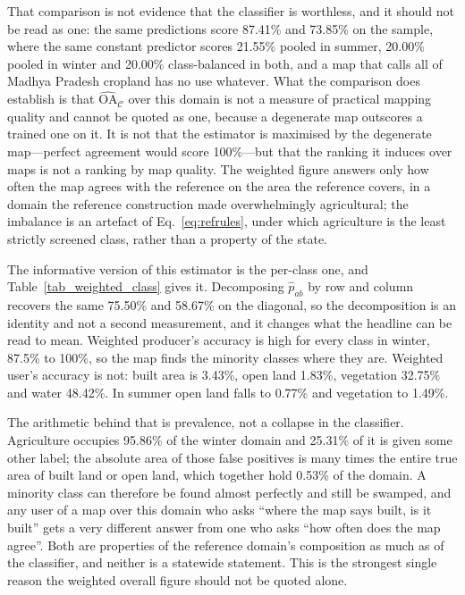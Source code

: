 \documentclass[conference]{IEEEtran}
\begin{document}
That comparison is not evidence that the classifier is worthless, and it should not be read as one: the same predictions score 87.41\% and 73.85\% on the sample, where the same constant predictor scores 21.55\% pooled in summer, 20.00\% pooled in winter and 20.00\% class-balanced in both, and a map that calls all of Madhya Pradesh cropland has no use whatever. What the comparison does establish is that $\widehat{\mathrm{OA}}_{\mathcal{C}}$ over this domain is not a measure of practical mapping quality and cannot be quoted as one, because a degenerate map outscores a trained one on it. It is not that the estimator is maximised by the degenerate map---perfect agreement would score 100\%---but that the ranking it induces over maps is not a ranking by map quality. The weighted figure answers only how often the map agrees with the reference on the area the reference covers, in a domain the reference construction made overwhelmingly agricultural; the imbalance is an artefact of Eq.~\eqref{eq:refrules}, under which agriculture is the least strictly screened class, rather than a property of the state.

The informative version of this estimator is the per-class one, and Table~\ref{tab_weighted_class} gives it. Decomposing $\hat{p}_{ab}$ by row and column recovers the same 75.50\% and 58.67\% on the diagonal, so the decomposition is an identity and not a second measurement, and it changes what the headline can be read to mean. Weighted producer's accuracy is high for every class in winter, 87.5\% to 100\%, so the map finds the minority classes where they are. Weighted user's accuracy is not: built area is 3.43\%, open land 1.83\%, vegetation 32.75\% and water 48.42\%. In summer open land falls to 0.77\% and vegetation to 1.49\%.

The arithmetic behind that is prevalence, not a collapse in the classifier. Agriculture occupies 95.86\% of the winter domain and 25.31\% of it is given some other label; the absolute area of those false positives is many times the entire true area of built land or open land, which together hold 0.53\% of the domain. A minority class can therefore be found almost perfectly and still be swamped, and any user of a map over this domain who asks ``where the map says built, is it built'' gets a very different answer from one who asks ``how often does the map agree''. Both are properties of the reference domain's composition as much as of the classifier, and neither is a statewide statement. This is the strongest single reason the weighted overall figure should not be quoted alone.
\end{document}
